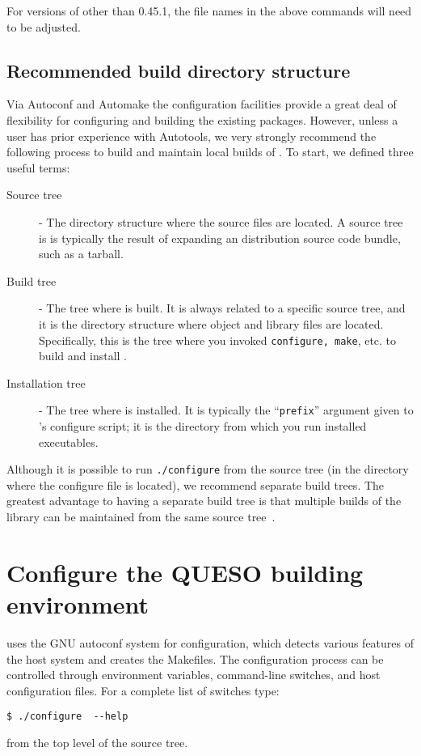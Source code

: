 For versions of \Queso{} other than 0.45.1, the file names in the above commands will need to be adjusted.


\subsection{Recommended build directory structure}\label{sec:Queso_tree}

Via Autoconf and Automake the \Queso{} configuration facilities provide a great deal 
of flexibility for configuring and building the existing \Queso{} packages. However,
unless a user has prior experience with Autotools, we very strongly recommend
the following process to build and maintain local builds of \Queso{}.
To start, we defined three useful terms:

\begin{description}
 \item [Source tree] - The directory structure where the \Queso{} source files are located. A source
tree is is typically the result of expanding an \Queso{} distribution source code bundle, such as a tarball.%
 \item [Build tree] %
- The tree where \Queso{} is built. It is always related to a specific source tree, and it is the directory structure where object and library files are located. Specifically, this is the tree where you invoked \texttt{configure, make}, etc. to build and install \Queso{}. 
 \item [Installation tree] - The tree where \Queso{} is installed. It is typically the ``\texttt{prefix}'' argument given to \Queso{}'s configure script; it is the directory from which you run installed \Queso{} executables.
\end{description}

Although it is possible to run \verb+./configure+ from the source tree (in the directory where the configure file is located), we recommend separate build trees. The greatest advantage to having a separate build tree is that multiple builds of the library
can be maintained from the same source tree~\cite{Trilinos}.


\section{Configure the QUESO building environment}\label{sec:Queso_configure}
\Queso{} uses the GNU autoconf system for configuration, which detects various features of the host system and creates the Makefiles. 
The configuration process can be controlled through environment variables, command-line switches, and host configuration files.
For a complete list of switches type:
\begin{lstlisting}
$ ./configure  --help  
\end{lstlisting}
%
from the top level of the source tree. 

